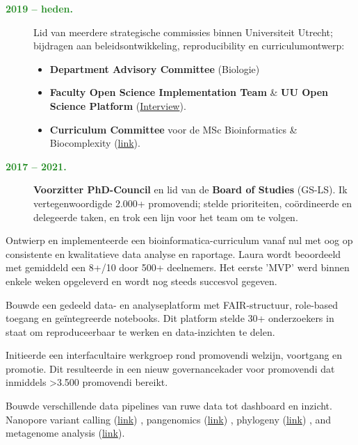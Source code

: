 \documentclass[a4paper,10pt]{article}
\begin{document}
{\begin{adjustbox}{valign=t}
\begin{minipage}[t]{0.6\textwidth}
\begin{description}
  \item[\normalfont \textcolor{ForestGreen}{\textbf{2019 -- heden.}}] 
    Lid van meerdere strategische commissies binnen Universiteit Utrecht;
    bijdragen aan beleidsontwikkeling, reproducibility en curriculumontwerp:
    \begin{itemize}
      \item \textbf{Department Advisory Committee} (Biologie)
      \item \textbf{Faculty Open Science Implementation Team} \& \textbf{UU Open Science Platform} 
      (\href{https://www.uu.nl/en/news/meet-laura-dijkhuizen}{Interview}).
      \item \textbf{Curriculum Committee} voor de MSc Bioinformatics \& Biocomplexity 
        (\href{https://www.uu.nl/en/masters/bioinformatics-and-biocomplexity}{link}).
    \end{itemize}
  \item[\normalfont \textcolor{ForestGreen}{\textbf{2017 -- 2021.}}] \textbf{Voorzitter PhD-Council} en lid van de \textbf{Board of Studies} (GS-LS).
    Ik vertegenwoordigde 2.000+ promovendi; stelde prioriteiten, coördineerde en delegeerde taken, en trok een lijn voor het team om te volgen.
\end{description}


\begin{description}
  \item Ontwierp en implementeerde een bioinformatica-curriculum vanaf nul met oog op consistente en kwalitatieve data analyse en raportage.
    Laura wordt beoordeeld met gemiddeld een 8+/10 door 500+ deelnemers.
    Het eerste 'MVP' werd binnen enkele weken opgeleverd en wordt nog steeds succesvol gegeven.
  \item Bouwde een gedeeld data- en analyseplatform met FAIR-structuur, role-based toegang en geïntegreerde notebooks.
    Dit platform stelde 30+ onderzoekers in staat om reproduceerbaar te werken en data-inzichten te delen.
  \item Initieerde een interfacultaire werkgroep rond promovendi welzijn, voortgang en promotie.
    Dit resulteerde in een nieuw governancekader voor promovendi dat inmiddels >3.500 promovendi bereikt.
  \item Bouwde verschillende data pipelines van ruwe data tot dashboard en inzicht.
    Nanopore variant calling (\href{https://github.com/lauralwd/anabaena_nanopore_workflow}{link})  
    , pangenomics (\href{https://github.com/lauralwd/Nostoc_azollae_pangenomics}{link})
    , phylogeny (\href{https://github.com/lauralwd/lauras_phylogeny_wf}{link})
    , and metagenome analysis (\href{https://github.com/lauralwd/Azolla_genus_meta_pangenome}{link}). 
\end{description}


\end{minipage}%
\end{adjustbox}%
}
\newpage
\end{document}
